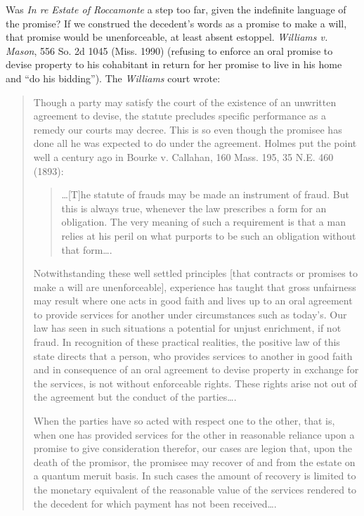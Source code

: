 \item
Was \textit{In re Estate of Roccamonte} a step too far, given the indefinite
language of the promise? If we construed the decedent's words as a promise to
make a will, that promise would be unenforceable, at least absent estoppel.
\emph{Williams v. Mason}, 556 So. 2d 1045 (Miss. 1990) (refusing to enforce an oral
promise to devise property to his cohabitant in return for her promise to live
in his home and ``do his bidding''). The \textit{Williams} court wrote:
\begin{quotation}
Though a party may satisfy the court of the existence of an unwritten agreement
to devise, the statute precludes specific performance as a remedy our courts
may decree. This is so even though the promisee has done all he was expected to
do under the agreement. Holmes put the point well a century ago in Bourke v.
Callahan, 160 Mass. 195, 35 N.E. 460 (1893):
\begin{quote}
\dots [T]he statute of frauds may be made an instrument of fraud. But this is
always true, whenever the law prescribes a form for an obligation. The very
meaning of such a requirement is that a man relies at his peril on what
purports to be such an obligation without that form\dots.
\end{quote}
Notwithstanding these well settled principles [that contracts or promises to
make a will are unenforceable], experience has taught that gross unfairness may
result where one acts in good faith and lives up to an oral agreement to
provide services for another under circumstances such as today's. Our law has
seen in such situations a potential for unjust enrichment, if not fraud. In
recognition of these practical realities, the positive law of this state
directs that a person, who provides services to another in good faith and in
consequence of an oral agreement to devise property in exchange for the
services, is not without enforceable rights. These rights arise not out of the
agreement but the conduct of the parties\dots.

When the parties have so acted with respect one to the other, that is, when one
has provided services for the other in reasonable reliance upon a promise to
give consideration therefor, our cases are legion that, upon the death of the
promisor, the promisee may recover of and from the estate on a quantum meruit
basis. In such cases the amount of recovery is limited to the monetary
equivalent of the reasonable value of the services rendered to the decedent for
which payment has not been received\dots.


\end{quotation}
